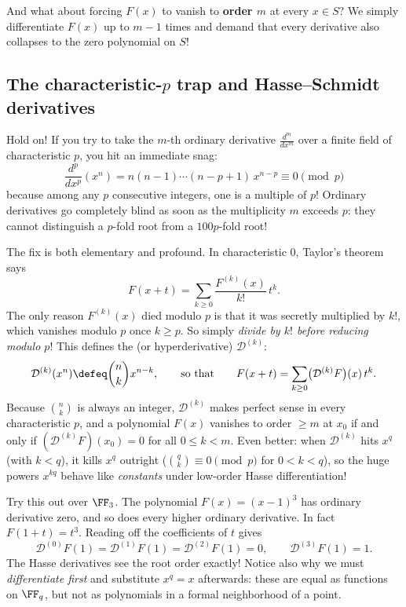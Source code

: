 And what about forcing \(F(x)\) to vanish to \textbf{order \(m\)} at every \(x \in S\)? We simply differentiate \(F(x)\) up to \(m-1\) times and demand that every derivative also collapses to the zero polynomial on \(S\)!

\subsection{The characteristic-\(p\) trap and Hasse--Schmidt derivatives}

Hold on! If you try to take the \(m\)-th ordinary derivative \(\frac{d^m}{dx^m}\) over a finite field of characteristic \(p\), you hit an immediate snag:
\[
  \frac{d^p}{dx^p}(x^n) = n(n-1)\cdots(n-p+1)\,x^{n-p} \equiv 0 \pmod{p}
\]
because among any \(p\) consecutive integers, one is a multiple of \(p\)! Ordinary derivatives go completely blind as soon as the multiplicity \(m\) exceeds \(p\): they cannot distinguish a \(p\)-fold root from a \(100p\)-fold root!

The fix is both elementary and profound. In characteristic \(0\), Taylor's theorem says
\[
  F(x + t) = \sum_{k \ge 0} \frac{F^{(k)}(x)}{k!}\,t^k.
\]
The only reason \(F^{(k)}(x)\) died modulo \(p\) is that it was secretly multiplied by \(k!\), which vanishes modulo \(p\) once \(k \ge p\). So simply \emph{divide by \(k!\) before reducing modulo \(p\)}! This defines the  (or hyperderivative) \(\mathcal{D}^{(k)}\):
\begin{equation}
  \mathcal{D}^{(k)}(x^n) \defeq \binom{n}{k} x^{n-k},
  \qquad\text{so that}\qquad
  F(x+t) = \sum_{k \ge 0} \bigl(\mathcal{D}^{(k)} F\bigr)(x)\,t^k.
  \label{eq:N20261125-hasse}
\end{equation}
Because \(\binom{n}{k}\) is always an integer, \(\mathcal{D}^{(k)}\) makes perfect sense in every characteristic \(p\), and a polynomial \(F(x)\) vanishes to order \(\ge m\) at \(x_0\) if and only if \((\mathcal{D}^{(k)} F)(x_0) = 0\) for all \(0 \le k < m\). Even better: when \(\mathcal{D}^{(k)}\) hits \(x^q\) (with \(k < q\)), it kills \(x^q\) outright (\(\binom{q}{k} \equiv 0 \pmod p\) for \(0 < k < q\)), so the huge powers \(x^{kq}\) behave like \emph{constants} under low-order Hasse differentiation!

Try this out over \(\FF_3\). The polynomial \(F(x)=(x-1)^3\) has ordinary derivative zero, and so does every higher ordinary derivative. In fact \(F(1+t)=t^3\). Reading off the coefficients of \(t\) gives
\[
 \mathcal D^{(0)}F(1)=\mathcal D^{(1)}F(1)
 =\mathcal D^{(2)}F(1)=0,\qquad
 \mathcal D^{(3)}F(1)=1.
\]
The Hasse derivatives see the root order exactly! Notice also why we must \emph{differentiate first} and substitute \(x^q=x\) afterwards: these are equal as functions on \(\FF_q\), but not as polynomials in a formal neighborhood of a point.

